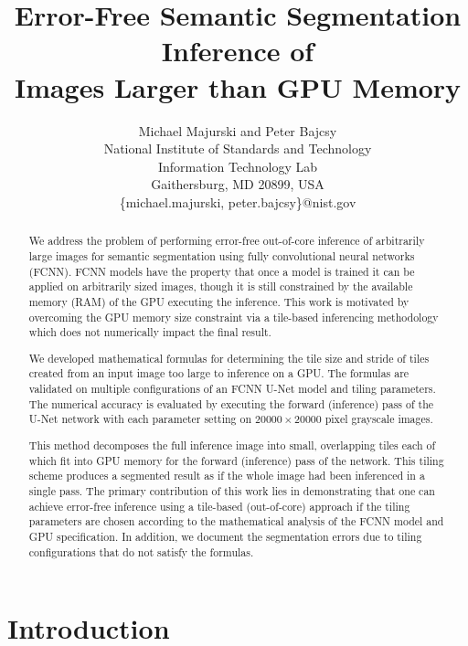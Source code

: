 \documentclass[letterpaper]{article} %
\title{Error-Free Semantic Segmentation Inference of \\
	Images Larger than GPU Memory}
\author{Michael Majurski and Peter Bajcsy\\
	National Institute of Standards and Technology\\
	Information Technology Lab\\
	Gaithersburg, MD 20899, USA\\
	\{michael.majurski, peter.bajcsy\}@nist.gov
}
\begin{document}
\maketitle
 
\begin{abstract}

We address the problem of performing error-free out-of-core inference of arbitrarily large images for semantic segmentation using fully convolutional neural networks (FCNN). FCNN models have the property that once a model is trained it can be applied on arbitrarily sized images, though it is still constrained by the available memory (RAM) of the GPU executing the inference. This work is motivated by overcoming the GPU memory size constraint via a tile-based inferencing methodology which does not numerically impact the final result.

We developed mathematical formulas for determining the tile size and stride of tiles created from an input image too large to inference on a GPU. The formulas are validated on multiple configurations of an FCNN U-Net model and tiling parameters. The numerical accuracy is evaluated by executing the forward (inference) pass of the U-Net network with each parameter setting on $\num{20000} \times \num{20000}$ pixel grayscale images. 

This method decomposes the full inference image into small, overlapping tiles each of which fit into GPU memory for the forward (inference) pass of the network. 
This tiling scheme produces a segmented result as if the whole image had been inferenced in a single pass. 
The primary contribution of this work lies in demonstrating that one can achieve error-free inference using a tile-based (out-of-core) approach if the tiling parameters are chosen according to the mathematical analysis of the FCNN model and GPU specification. 
In addition, we document the segmentation errors due to tiling configurations that do not satisfy the formulas. 

\end{abstract}

\section{Introduction}
\end{document}
